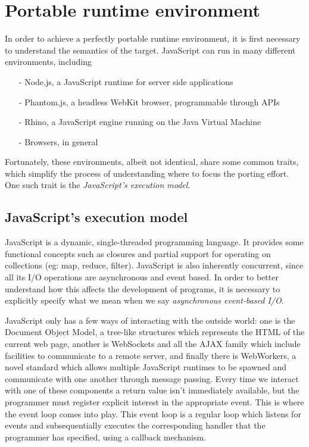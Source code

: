 \documentclass{sig-alternate}
\begin{document}
\section{Portable runtime environment}\label{sec:challenges}

In order to achieve a perfectly portable runtime environment, it is first necessary to understand the semantics of the target. 
JavaScript can run in many different environments, including
\begin{itemize}
\item[-]{Node.js, a JavaScript runtime for server side applications}
\item[-]{Phantom.js, a headless WebKit browser, programmable through APIs}
\item[-]{Rhino, a JavaScript engine running on the Java Virtual Machine}
\item[-]{Browsers, in general}
\end{itemize} 
Fortunately, these environments, albeit not identical, share some common traits, which simplify the process of understanding where to focus the porting effort. One such trait is the \textit{JavaScript's execution model}.

\subsection{JavaScript's execution model}

JavaScript is a dynamic, single-threaded programming language. It provides some functional concepts such as closures and partial support for operating on collections (eg: map, reduce, filter).
JavaScript is also inherently concurrent, since all its I/O operations are asynchronous and event based.
In order to better understand how this affects the development of programs, it is necessary to explicitly specify what we mean when we say \textit{asynchronous event-based I/O}.

JavaScript only has a few ways of interacting with the outside world: one is the Document Object Model, a tree-like structures which represents the HTML of the current web page, another is WebSockets and all the AJAX family which include facilities to communicate to a remote server, and finally there is WebWorkers, a novel standard which allows multiple JavaScript runtimes to be spawned and communicate with one another through message passing.
Every time we interact with one of these components a return value isn't immediately available, but the programmer must register explicit interest in the appropriate event. This is where the event loop comes into play. This event loop is a regular loop which listens for events and subsequentially executes the corresponding handler that the programmer has specified, using a callback mechanism.
\end{document}
